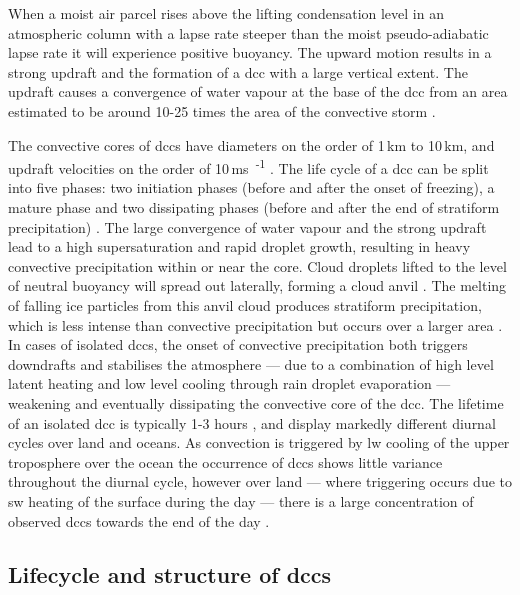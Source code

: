 When a moist air parcel rises above the lifting condensation level in an atmospheric column with a lapse rate steeper than the moist pseudo-adiabatic lapse rate it will experience positive buoyancy.
The upward motion results in a strong updraft and the formation of a \acrshort{dcc} with a large vertical extent.
The updraft causes a convergence of water vapour at the base of the \acrshort{dcc} from an area estimated to be around 10-25 times the area of the convective storm \citep{trenberth_changing_2003}.

The convective cores of \acrshort{dcc}s have diameters on the order of 1\,\unit{km} to 10\,\unit{km}, and updraft velocities on the order of 10\,\unit{ms\textsuperscript{-1}} \citep{weisman_mesoscale_2015}.
The life cycle of a \acrshort{dcc} can be split into five phases: two initiation phases (before and after the onset of freezing), a mature phase and two dissipating phases (before and after the end of stratiform precipitation) \citep{wall_life_2018}.
The large convergence of water vapour and the strong updraft lead to a high supersaturation and rapid droplet growth, resulting in heavy convective precipitation within or near the core.
Cloud droplets lifted to the level of neutral buoyancy will spread out laterally, forming a cloud anvil \citep{houze_chapter_2014}. 
The melting of falling ice particles from this anvil cloud produces stratiform precipitation, which is less intense than convective precipitation but occurs over a larger area \citep{houze_stratiform_1997}.
In cases of isolated \acrshort{dcc}s, the onset of convective precipitation both triggers downdrafts and stabilises the atmosphere --- due to a combination of high level latent heating and low level cooling through rain droplet evaporation --- weakening and eventually dissipating the convective core of the \acrshort{dcc}.
The lifetime of an isolated \acrshort{dcc} is typically 1-3 hours \citep{chen_diurnal_1997}, and display markedly different diurnal cycles over land and oceans. 
As convection is triggered by \acrshort{lw}  cooling of the upper troposphere over the ocean the occurrence of \acrshort{dcc}s shows little variance throughout the diurnal cycle, however over land --- where triggering occurs due to \acrshort{sw}  heating of the surface during the day --- there is a large concentration of observed \acrshort{dcc}s towards the end of the day \citep{taylor_evaluating_2017}.


\subsection{Lifecycle and structure of \acrshort{dcc}s}

